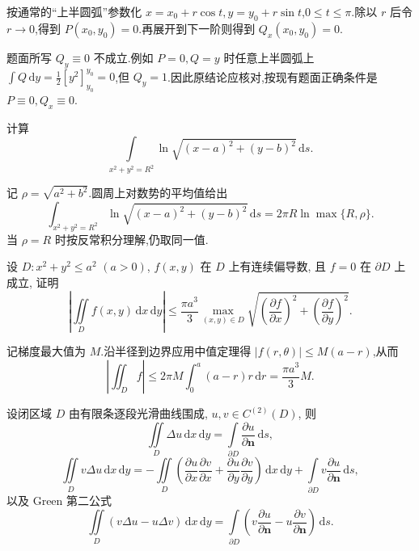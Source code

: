 \begin{solution}
    按通常的``上半圆弧''参数化 $x=x_0+r\cos t,y=y_0+r\sin t$,$0\leq t\leq\pi$.除以 $r$ 后令 $r\to0$,得到 $P(x_0,y_0)=0$.再展开到下一阶则得到 $Q_x(x_0,y_0)=0$.

    题面所写 $Q_y\equiv0$ 不成立.例如 $P=0,Q=y$ 时任意上半圆弧上 $\displaystyle\int Q\,\mathrm{d}y=\frac{1}{2}[y^2]_{y_0}^{y_0}=0$,但 $Q_y=1$.因此原结论应核对,按现有题面正确条件是 $P\equiv0,Q_x\equiv0$.
\end{solution}

\begin{example}
    计算
    \[
        \displaystyle\int\limits_{x^2+y^2=R^2}\ln\sqrt{(x-a)^2+(y-b)^2}\,\mathrm{d}s.
    \]
\end{example}
\exampleblank

\begin{solution}
    记 $\rho=\sqrt{a^2+b^2}$.圆周上对数势的平均值给出
    \[
        \displaystyle\int_{x^2+y^2=R^2}\ln\sqrt{(x-a)^2+(y-b)^2}\,\mathrm{d}s
        =2\pi R\ln\max\{R,\rho\}.
    \]
    当 $\rho=R$ 时按反常积分理解,仍取同一值.
\end{solution}

\begin{example}
    设 $D:x^2+y^2\leq a^2$ $(a>0)$, $f(x,y)$ 在 $D$ 上有连续偏导数, 且 $f=0$ 在 $\partial D$ 上成立, 证明
    \[
        \left|\iint\limits_Df(x,y)\,\mathrm{d}x\,\mathrm{d}y\right|
        \leq\dfrac{\pi a^3}{3}\max_{(x,y)\in D}
        \sqrt{\left(\dfrac{\partial f}{\partial x}\right)^2+
            \left(\dfrac{\partial f}{\partial y}\right)^2}.
    \]
\end{example}
\exampleblank

\begin{solution}
    记梯度最大值为 $M$.沿半径到边界应用中值定理得 $|f(r,\theta)|\leq M(a-r)$,从而
    \[
        \left|\iint_Df\right|\leq2\pi M\int_0^a(a-r)r\,\mathrm{d}r=\dfrac{\pi a^3}{3}M.
    \]
\end{solution}




\begin{theorem}[\markstar]
    设闭区域 $D$ 由有限条逐段光滑曲线围成, $u,v\in C^{(2)}(D)$, 则
    \[
        \displaystyle\iint\limits_D\Delta u\,\mathrm{d}x\,\mathrm{d}y
        =\int\limits_{\partial D}\dfrac{\partial u}{\partial\bm n}\,\mathrm{d}s,
    \]
    \[
        \displaystyle\iint\limits_Dv\Delta u\,\mathrm{d}x\,\mathrm{d}y
        =-\iint\limits_D\left(
        \dfrac{\partial u}{\partial x}\dfrac{\partial v}{\partial x}
        +\dfrac{\partial u}{\partial y}\dfrac{\partial v}{\partial y}
        \right)\,\mathrm{d}x\,\mathrm{d}y
        +\int\limits_{\partial D}v\dfrac{\partial u}{\partial\bm n}\,\mathrm{d}s,
    \]
    以及 Green 第二公式
    \[
        \displaystyle\iint\limits_D(v\Delta u-u\Delta v)\,\mathrm{d}x\,\mathrm{d}y
        =\int\limits_{\partial D}\left(v\dfrac{\partial u}{\partial\bm n}-u\dfrac{\partial v}{\partial\bm n}\right)\,\mathrm{d}s.
    \]
\end{theorem}

